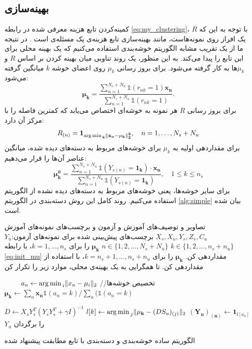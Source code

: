 \subsection{بهینه‌سازی}\label{simple_opt}
 کمینه‌کردن تابع هزینه معرفی شده در رابطه
\eqref{eq:my_clustering}،
با توجه به این که $R$ یک افراز روی نمونه‌هاست، مانند بهینه‌سازی تابع هزینه‌ی  یک مسئله‌ی \nphard است \cite{kmeans_nphard}. در نتیجه ما از یک تقریب
مشابه الگوریتم خوشه‌بندی  استفاده می‌کنیم که یک بهینه محلی برای این تابع را پیدا می‌کند. به این منظور،  یک روند تناوبی  میان بهینه کردن بر اساس $R$ و $\mu_k$ها به کار گرفته می‌شود. برای بروز رسانی $\mu_k$ روی اعضای خوشه $k$ میانگین گرفته می‌شود:
\begin{equation} \label{eq:updata_mu}
 \boldsymbol{\mu_k} = \frac{\sum_{n=1}^{N_s + N_u}  \mathds{1}(r_{nk}=1)\mathbf{x_n}}{\sum_{n=1}^{N_s+N_u}\mathds{1}(r_{nk}=1)}.
\end{equation}
برای بروز رسانی $R$ هر نمونه به خوشه‌ای اختصاص می‌یابد که کمترین فاصله را با مرکز آن دارد:
\begin{equation} \label{eq:updata_R}
R_{(n)} = \mathbf{1_{\operatorname*{arg\,min\,}_k \left \lVert x_n - \mu_k \right \rVert_2^2}}, \quad n=1,\ldots,N_s+N_u
\end{equation}
برای مقداردهی اولیه به $\mu_k$ برای  خوشه‌های مربوط به دسته‌های دیده شده، میانگین عناصر آن‌ها را قرار می‌دهیم:
\begin{equation} \label{eq:init_mu}
 \boldsymbol{\mu_k^0} = \frac{\sum_{n=1}^{N_s + N_u}  \mathds{1}(Y_{s(n)} = \mathbf{1_k})\cdot \mathbf{x_n}}{\sum_{n=1}^{N_s+N_u}\mathds{1}(Y_{s(n)} = \mathbf{1_k})},
\quad 1 \leq k \leq n_s
\end{equation}
برای سایر خوشه‌ها، یعنی خوشه‌های مربوط به دسته‌های دیده نشده از الگوریتم
 \cite{kmeanspp}
استفاده می‌کنیم.
روند کامل این روش دسته‌بندی در الگوریتم
\ref{alg:simple}
بیان شده است.

	\begin{enumerate}[label={\arabic*},itemsep=.1em, parsep=.1em]
 تصاویر و توصیف‌های آموزش و آزمون و برچسب‌های نمونه‌های آموزش $X_s, X_u, Y_s, Z_s, C_u$
 برچسب‌های پیش‌بینی شده برای نمونه‌های آزمون:$Y_u$
   $k \in \{ 1,2, \ldots, n_s + n_u \}$
  $n \in \{ 1,2, \ldots, N_s + N_u \}$
  $\boldsymbol{\mu_k}$ را برای  $k=1,\ldots,n_s$،  با رابطه \eqref{eq:init_mu} مقداردهی کن.
  $\boldsymbol{\mu_k}$ را برای $k=n_s+1,\ldots,n_s+n_u$، با استفاده از  مقداردهی کن.
 تا همگرایی به یک بهینه‌ی محلی، موارد زیر را تکرار کن

 $\qquad$   $ a_n \leftarrow  {\operatorname*{arg\,min\,}_i \lVert x_n - \mu_i \rVert_2}$ //تخصیص خوشه‌ها
 $\qquad$ $\mathbf{\mu_k} \leftarrow \sum_{n} \mathbf{x_n} \mathds{1}(a_n = k) / \sum_n (\mathds{1}(a_n = k) $

  $  D \leftarrow X_s Y_s^T (Y_s Y_s^T + \gamma I)^{-1}$
  $l[k] \leftarrow \operatorname*{arg\,min\,}_j \lVert \mathbf{\mu_k} - (DS_u)_{(j)} \rVert_2$
   $\mathbf{(Y_u)_{(n)}} \leftarrow \mathbf{1}_{l[a_n]}$
 $Y_u$ را برگردان
\end{enumerate}
\caption{الگوریتم ساده خوشه‌بندی و دسته‌بندی با تابع مطابقت پیشنهاد شده}
\label{alg:simple}


